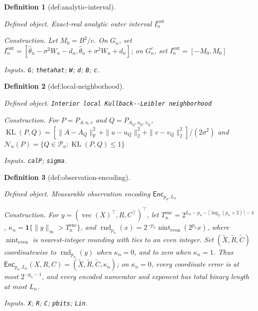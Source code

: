 \documentclass{article}
\newtheorem{definition}{Definition}
\begin{document}
\begin{definition}[def:analytic-interval]\label{def:analytic-interval}
\par\smallskip\noindent\emph{Defined object.} Exact-real analytic outer interval \(I_n^{\mathrm{out}}\)
\par\smallskip\noindent\emph{Construction.} Let \(M_0=B^2/c\). On \(G_n\), set \(I_n^{\mathrm{out}}=[\widehat\theta_n-\sigma^2W_n-d_n,\widehat\theta_n+\sigma^2W_n+d_n]\); on \(G_n^c\), set \(I_n^{\mathrm{out}}=[-M_0,M_0]\)
\par\smallskip\noindent\emph{Inputs.} \texttt{G}; \texttt{thetahat}; \texttt{W}; \texttt{d}; \texttt{B}; \texttt{c}.
\end{definition}

\begin{definition}[def:local-neighborhood]\label{def:local-neighborhood}
\par\smallskip\noindent\emph{Defined object.} \texttt{Interior local Kullback-\allowbreak{}-\allowbreak{}Leibler neighborhood}
\par\smallskip\noindent\emph{Construction.} For \(P=P_{A,u,v}\) and \(Q=P_{A_Q,u_Q,v_Q}\), \(\operatorname{KL}(P,Q)=[\|A-A_Q\|_{\mathrm F}^2+\|u-u_Q\|_2^2+\|v-v_Q\|_2^2]/(2\sigma^2)\) and \(\mathcal N_n(P)=\{Q\in\mathcal P_n:\operatorname{KL}(P,Q)\le1\}\)
\par\smallskip\noindent\emph{Inputs.} \texttt{calP}; \texttt{sigma}.
\end{definition}

\begin{definition}[def:observation-encoding]\label{def:observation-encoding}
\par\smallskip\noindent\emph{Defined object.} Measurable observation encoding \(\mathsf{Enc}_{p_n,L_n}\)
\par\smallskip\noindent\emph{Construction.} For \(y=(\operatorname{vec}(X)^{\top},R,C^{\top})^{\top}\), let \(T_n^{\mathrm{enc}}=2^{L_n-p_n-\lceil\log_2(p_n+2)\rceil-4}\), \(\kappa_n=\mathbf 1\{\|y\|_\infty>T_n^{\mathrm{enc}}\}\), and \(\operatorname{rnd}_{p_n}(x)=2^{-p_n}\operatorname{nint}_{\mathrm{even}}(2^{p_n}x)\), where \(\operatorname{nint}_{\mathrm{even}}\) is nearest-integer rounding with ties to an even integer. Set \((\widetilde X,\widetilde R,\widetilde C)\) coordinatewise to \(\operatorname{rnd}_{p_n}(y)\) when \(\kappa_n=0\), and to zero when \(\kappa_n=1\). Thus \(\mathsf{Enc}_{p_n,L_n}(X,R,C)=(\widetilde X,\widetilde R,\widetilde C,\kappa_n)\); on \(\kappa_n=0\), every coordinate error is at most \(2^{-p_n-1}\), and every encoded numerator and exponent has total binary length at most \(L_n\).
\par\smallskip\noindent\emph{Inputs.} \texttt{X}; \texttt{R}; \texttt{C}; \texttt{pbits}; \texttt{Lin}.
\end{definition}
\end{document}
